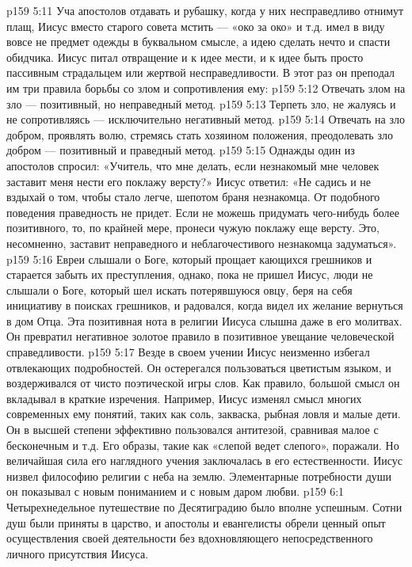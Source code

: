\vs p159 5:11 Уча апостолов отдавать и рубашку, когда у них несправедливо отнимут плащ, Иисус вместо старого совета мстить --- «око за око» и т.д. имел в виду вовсе не предмет одежды в буквальном смысле, а идею сделать нечто  и спасти обидчика. Иисус питал отвращение и к идее мести, и к идее быть просто пассивным страдальцем или жертвой несправедливости. В этот раз он преподал им три правила борьбы со злом и сопротивления ему:
\vs p159 5:12 \bibnobreakspace Отвечать злом на зло --- позитивный, но неправедный метод.
\vs p159 5:13 \bibnobreakspace Терпеть зло, не жалуясь и не сопротивляясь --- исключительно негативный метод.
\vs p159 5:14 \bibnobreakspace Отвечать на зло добром, проявлять волю, стремясь стать хозяином положения, преодолевать зло добром --- позитивный и праведный метод.
\vs p159 5:15 \pc Однажды один из апостолов спросил: «Учитель, что мне делать, если незнакомый мне человек заставит меня нести его поклажу версту?» Иисус ответил: «Не садись и не вздыхай о том, чтобы стало легче, шепотом браня незнакомца. От подобного поведения праведность не придет. Если не можешь придумать чего\hyp{}нибудь более позитивного, то, по крайней мере, пронеси чужую поклажу еще версту. Это, несомненно, заставит неправедного и неблагочестивого незнакомца задуматься».
\vs p159 5:16 Евреи слышали о Боге, который прощает кающихся грешников и старается забыть их преступления, однако, пока не пришел Иисус, люди не слышали о Боге, который шел искать потерявшуюся овцу, беря на себя инициативу в поисках грешников, и радовался, когда видел их желание вернуться в дом Отца. Эта позитивная нота в религии Иисуса слышна даже в его молитвах. Он превратил негативное золотое правило в позитивное увещание человеческой справедливости.
\vs p159 5:17 Везде в своем учении Иисус неизменно избегал отвлекающих подробностей. Он остерегался пользоваться цветистым языком, и воздерживался от чисто поэтической игры слов. Как правило, большой смысл он вкладывал в краткие изречения. Например, Иисус изменял смысл многих современных ему понятий, таких как соль, закваска, рыбная ловля и малые дети. Он в высшей степени эффективно пользовался антитезой, сравнивая малое с бесконечным и т.д. Его образы, такие как «слепой ведет слепого», поражали. Но величайшая сила его наглядного учения заключалась в его естественности. Иисус низвел философию религии с неба на землю. Элементарные потребности души он показывал с новым пониманием и с новым даром любви.
\vs p159 6:1 Четырехнедельное путешествие по Десятиградию было вполне успешным. Сотни душ были приняты в царство, и апостолы и евангелисты обрели ценный опыт осуществления своей деятельности без вдохновляющего непосредственного личного присутствия Иисуса.
